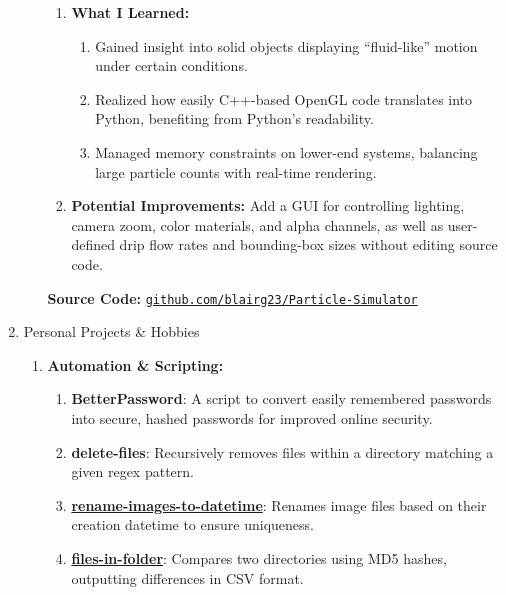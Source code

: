 \documentclass[oneside]{article}%
\begin{document}
\begin{enumerate}[]
\begin{enumerate}[]
\begin{enumerate}[-]
					\item \textbf{What I Learned:}
						\begin{enumerate}[--]
							\item Gained insight into solid objects displaying “fluid-like” motion under certain conditions.
							\item Realized how easily C++-based OpenGL code translates into Python, benefiting from Python’s readability.
							\item Managed memory constraints on lower-end systems, balancing large particle counts 
							with real-time rendering.
						\end{enumerate}
				
					\item \textbf{Potential Improvements:} Add a GUI for controlling lighting, camera zoom, color materials, and alpha channels, 
					as well as user-defined drip flow rates and bounding-box sizes without editing source code.
				\end{enumerate}
				\vspace{3pt} %
				\textbf{Source Code:} \href{https://github.com/blairg23/Particle-Simulator}{\texttt{github.com/blairg23/Particle-Simulator}}\\
		\end{enumerate}

	\item \large{Personal Projects \& Hobbies}
		\small
		\begin{enumerate}[]
			\normalsize
			\item \textbf{Automation \& Scripting:}
			\small
				\begin{enumerate}[-]
					\item \textbf{BetterPassword}: A script to convert easily remembered passwords into secure, hashed passwords for improved online security.
					\item \textbf{delete-files}: Recursively removes files within a directory matching a given regex pattern.
					\item \textbf{\href{https://github.com/blairg23/rename-images-to-datetime}{rename-images-to-datetime}}: Renames image files based on their creation datetime to ensure uniqueness.
					\item \textbf{\href{https://github.com/blairg23/files-in-folder}{files-in-folder}}: Compares two directories using MD5 hashes, outputting differences in CSV format.
				\end{enumerate}
			

\end{enumerate}
\end{enumerate}
\end{document}
